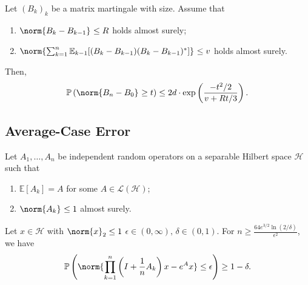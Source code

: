 \begin{lem}
  \label{bernsteinineq}
  Let \( (B_k)_k \) be a matrix martingale with size. Assume that 
  \begin{enumerate}[1)]
    \item \( \norm{B_k-B_{k-1}}_{} \leq R \) holds almost surely;
    \item \( \norm{\sum_{k=1}^{n} \mathbb{E}_{k-1}[(B_k-B_{k-1})(B_{k}-B_{k-1})^*]}_{} \leq v \) holds almost surely.
  \end{enumerate}
  Then, 
  \[ \mathbb{P}\left(\norm{B_n-B_0}_{} \geq t\right) \leq 2d \cdot \operatorname{exp}\left(\frac{-t^{2}/2}{v+Rt/3}\right). \]
\end{lem}








\subsection{Average-Case Error}


\begin{thm}[]
 \label{avgcaseexp}

    Let \( A_1, \dots,A_n \) be independent random operators on a separable Hilbert space \( \mathcal{H} \) such that 
    \begin{enumerate}[1)]
      \item \( \mathbb{E}\left[A_k\right]=A \) for some \( A \in \mathcal{L}(\mathcal{H}) \);
      \item \( \norm{A_k}_{} \leq 1 \) almost surely.
    \end{enumerate}
    Let \( x \in \mathcal{H}\) with \( \norm{x}_{2} \leq 1 \) \( \epsilon \in (0,\infty),\, \delta \in (0,1) \). For \( n \geq \frac{64e^{3/2} \operatorname{ln}(2/\delta)}{\epsilon^{2}} \), we have 
  \[ \mathbb{P}\left(\norm{\prod_{k=1}^{n} \left(I+\frac{1}{n}A_k\right)x-e^{A}x}\leq\epsilon\right)  \geq 1-\delta.\]

\end{thm}
 
